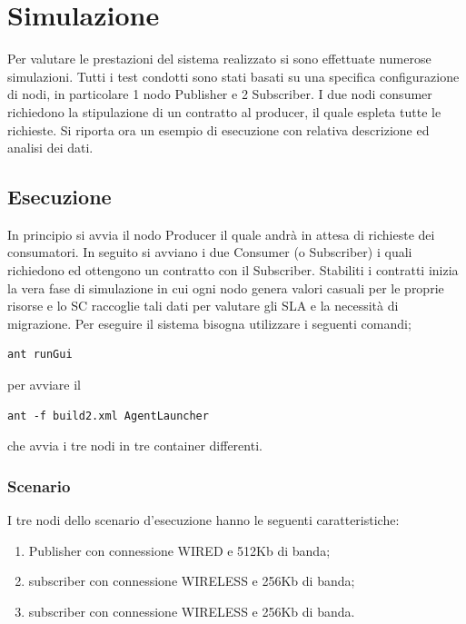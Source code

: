 \chapter{Simulazione}
Per valutare le prestazioni del sistema realizzato si sono effettuate numerose simulazioni. Tutti i test condotti sono stati basati su una specifica configurazione di nodi, in particolare 1 nodo Publisher e 2 Subscriber. I due nodi consumer richiedono la stipulazione di un contratto al producer, il quale espleta tutte le richieste. Si riporta ora un esempio di esecuzione con relativa descrizione ed analisi dei dati.
\section{Esecuzione}
In principio si avvia il nodo Producer il quale andrà in attesa di richieste dei consumatori. In seguito si avviano i due Consumer (o Subscriber) i quali richiedono ed ottengono un contratto con il Subscriber. Stabiliti i contratti inizia la vera fase di simulazione in cui ogni nodo genera valori casuali per le proprie risorse e lo SC raccoglie tali dati per valutare gli SLA e la necessità di migrazione. Per eseguire il sistema bisogna utilizzare i seguenti comandi;
\begin{verbatim}
ant runGui
\end{verbatim}
per avviare il 
\begin{verbatim}
ant -f build2.xml AgentLauncher
\end{verbatim}
che avvia i tre nodi in tre container differenti.
\subsection{Scenario}
I tre nodi dello scenario d'esecuzione hanno le seguenti caratteristiche:
\begin{enumerate}
	\item Publisher con connessione WIRED e 512Kb di banda;
	\item subscriber con connessione WIRELESS e 256Kb di banda;
	\item subscriber con connessione WIRELESS e 256Kb di banda.
\end{enumerate}
